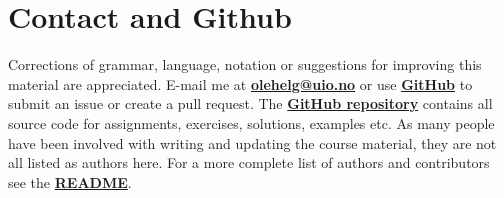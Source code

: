 \section*{Contact and Github}
Corrections of grammar, language, notation or suggestions for improving this material are appreciated.
E-mail me at \href{mailto:olehelg@uio.no}{\textbf{olehelg@uio.no}} or use \href{https://github.com/olehermanse/INF3490-AI_Machine_Learning}{\textbf{GitHub}} to submit an issue or create a pull request.
The \href{https://github.com/olehermanse/INF3490-AI_Machine_Learning}{\textbf{GitHub repository}} contains all source code for assignments, exercises, solutions, examples etc.
As many people have been involved with writing and updating the course material, they are not all listed as authors here.
For a more complete list of authors and contributors see the \href{https://github.com/olehermanse/INF3490-AI_Machine_Learning/blob/master/README.md}{\textbf{README}}.
